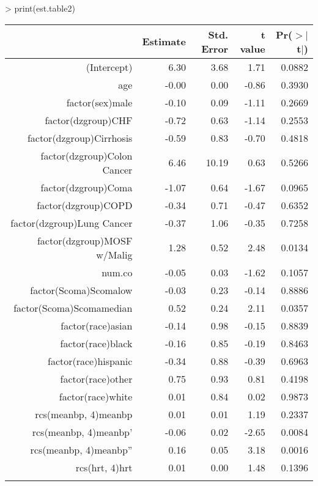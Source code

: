 \documentclass{article}
\begin{document}
\begin{Schunk}
\begin{Sinput}
> print(est.table2)
\end{Sinput}
% latex table generated in R 3.1.1 by xtable 1.7-3 package
% Fri Sep 19 22:45:02 2014
\begin{table}[ht]
\centering
\begin{tabular}{rrrrr}
  \hline
 & Estimate & Std. Error & t value & Pr($>$$|$t$|$) \\ 
  \hline
(Intercept) & 6.30 & 3.68 & 1.71 & 0.0882 \\ 
  age & -0.00 & 0.00 & -0.86 & 0.3930 \\ 
  factor(sex)male & -0.10 & 0.09 & -1.11 & 0.2669 \\ 
  factor(dzgroup)CHF & -0.72 & 0.63 & -1.14 & 0.2553 \\ 
  factor(dzgroup)Cirrhosis & -0.59 & 0.83 & -0.70 & 0.4818 \\ 
  factor(dzgroup)Colon Cancer & 6.46 & 10.19 & 0.63 & 0.5266 \\ 
  factor(dzgroup)Coma & -1.07 & 0.64 & -1.67 & 0.0965 \\ 
  factor(dzgroup)COPD & -0.34 & 0.71 & -0.47 & 0.6352 \\ 
  factor(dzgroup)Lung Cancer & -0.37 & 1.06 & -0.35 & 0.7258 \\ 
  factor(dzgroup)MOSF w/Malig & 1.28 & 0.52 & 2.48 & 0.0134 \\ 
  num.co & -0.05 & 0.03 & -1.62 & 0.1057 \\ 
  factor(Scoma)Scomalow & -0.03 & 0.23 & -0.14 & 0.8886 \\ 
  factor(Scoma)Scomamedian & 0.52 & 0.24 & 2.11 & 0.0357 \\ 
  factor(race)asian & -0.14 & 0.98 & -0.15 & 0.8839 \\ 
  factor(race)black & -0.16 & 0.85 & -0.19 & 0.8463 \\ 
  factor(race)hispanic & -0.34 & 0.88 & -0.39 & 0.6963 \\ 
  factor(race)other & 0.75 & 0.93 & 0.81 & 0.4198 \\ 
  factor(race)white & 0.01 & 0.84 & 0.02 & 0.9873 \\ 
  rcs(meanbp, 4)meanbp & 0.01 & 0.01 & 1.19 & 0.2337 \\ 
  rcs(meanbp, 4)meanbp' & -0.06 & 0.02 & -2.65 & 0.0084 \\ 
  rcs(meanbp, 4)meanbp'' & 0.16 & 0.05 & 3.18 & 0.0016 \\ 
  rcs(hrt, 4)hrt & 0.01 & 0.00 & 1.48 & 0.1396 \\ 
$$
\end{tabular}
\end{table}
\end{Schunk}
\end{document}
